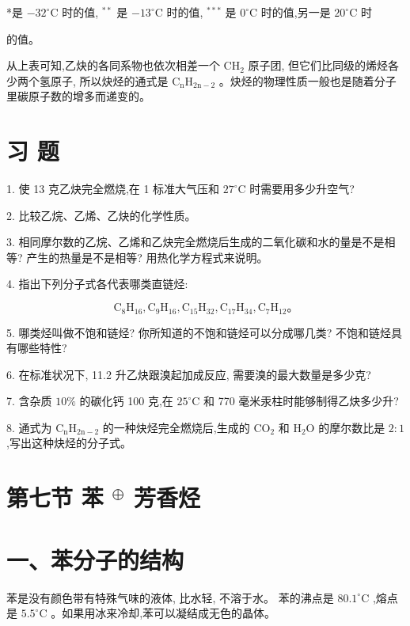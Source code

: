 \documentclass[10pt]{article}
\begin{document}
*是 \(- {32}^{ \circ }\mathrm{C}\) 时的值, \({}^{* * }\) 是 \(- {13}^{ \circ }\mathrm{C}\) 时的值, \({}^{* * * }\) 是 \({0}^{ \circ }\mathrm{C}\) 时的值,另一是 \({20}^{ \circ }\mathrm{C}\) 时

的值。

从上表可知,乙炔的各同系物也依次相差一个 \({\mathrm{{CH}}}_{2}\) 原子团, 但它们比同级的烯烃各少两个氢原子, 所以炔烃的通式是 \({\mathrm{C}}_{\mathrm{n}}{\mathrm{H}}_{2\mathrm{n} - 2}\) 。炔烃的物理性质一般也是随着分子里碳原子数的增多而递变的。

\section*{习 题}

1. 使 13 克乙炔完全燃烧,在 1 标准大气压和 \({27}^{ \circ }\mathrm{C}\) 时需要用多少升空气?

2. 比较乙烷、乙烯、乙炔的化学性质。

3. 相同摩尔数的乙烷、乙烯和乙炔完全燃烧后生成的二氧化碳和水的量是不是相等? 产生的热量是不是相等? 用热化学方程式来说明。

4. 指出下列分子式各代表哪类直链烃:

\[
{\mathrm{C}}_{8}{\mathrm{H}}_{16},{\mathrm{C}}_{9}{\mathrm{H}}_{16},{\mathrm{C}}_{15}{\mathrm{H}}_{32},{\mathrm{C}}_{17}{\mathrm{H}}_{34},{\mathrm{C}}_{7}{\mathrm{H}}_{12}\text{。}
\]

5. 哪类烃叫做不饱和链烃? 你所知道的不饱和链烃可以分成哪几类? 不饱和链烃具有哪些特性?

6. 在标准状况下, 11.2 升乙炔跟溴起加成反应, 需要溴的最大数量是多少克?

7. 含杂质 \({10}\%\) 的碳化钙 100 克,在 \({25}^{ \circ }\mathrm{C}\) 和 770 毫米汞柱时能够制得乙炔多少升?

8. 通式为 \({\mathrm{C}}_{\mathrm{n}}{\mathrm{H}}_{2\mathrm{n} - 2}\) 的一种炔烃完全燃烧后,生成的 \({\mathrm{{CO}}}_{2}\) 和 \({\mathrm{H}}_{2}\mathrm{O}\) 的摩尔数比是 \(2 : 1\) ,写出这种炔烃的分子式。

\section*{第七节 苯 \({}^{ \oplus }\) 芳香烃}

\section*{一、苯分子的结构}

苯是没有颜色带有特殊气味的液体, 比水轻, 不溶于水。 苯的沸点是 \({80.1}^{ \circ }\mathrm{C}\) ,熔点是 \({5.5}^{ \circ }\mathrm{C}\) 。如果用冰来冷却,苯可以凝结成无色的晶体。
\end{document}
